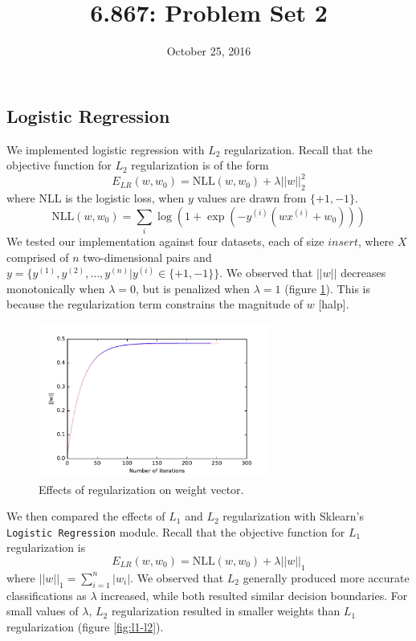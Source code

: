 \documentclass{article}
\title{6.867: Problem Set 2}
\date{October 25, 2016}
\begin{document}
\maketitle

\begin{multicols}{2}


\section{Logistic Regression}

We implemented logistic regression with $L_2$ regularization. Recall that the objective function for $L_2$ regularization is of the form
\begin{equation}
    E_{LR}(w, w_0) = \text{NLL}(w, w_0) + \lambda ||w||_2^2
\end{equation}
where NLL is the logistic loss, when $y$ values are drawn from $\{+1, -1\}$.
\begin{equation}
    \text{NLL}(w, w_0) = \sum_i{\log(1+\exp(-y^{(i)}(wx^{(i)}+w_0)))}
\end{equation}
We tested our implementation against four datasets, each of size $insert$, where $X$ comprised of $n$ two-dimensional pairs and $y=\{y^{(1)}, y^{(2)}, \dots ,y^{(n)} | y^{(i)} \in \{+1, -1\}\}$. We observed that $||w||$ decreases monotonically when $\lambda=0$, but is penalized when $\lambda=1$ (figure \ref{fig:weight-regularization}). This is because the regularization term constrains the magnitude of $w$ [halp].

\begin{figure}
   \centering
   \includegraphics[width=3in]{figures/1-1-weights.pdf}
   \caption{Effects of regularization on weight vector.}
   \label{fig:weight-regularization}
\end{figure}

We then compared the effects of $L_1$ and $L_2$ regularization with Sklearn's \texttt{Logistic Regression} module. Recall that the objective function for $L_1$ regularization is
\begin{equation}
    E_{LR}(w, w_0) = \text{NLL}(w, w_0) + \lambda ||w||_1
\end{equation}
where $||w||_1 = \sum_{i=1}^n{|w_i|}$.
We observed that $L_2$ generally produced more accurate classifications as $\lambda$ increased, while both resulted similar decision boundaries. For small values of $\lambda$, $L_2$ regularization resulted in smaller weights than $L_1$ regularization (figure \ref{fig:l1-l2}).


\end{multicols}
\end{document}

